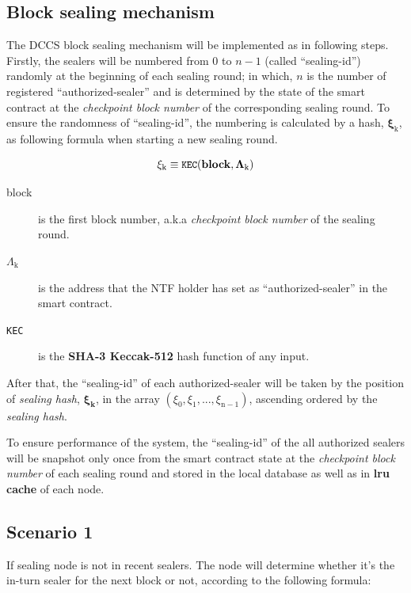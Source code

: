 \documentclass[12pt,oneside]{amsart}
\begin{document}
\begin{multicols}{2}
\section{Block sealing mechanism}\label{sec:sealing}
The {\small DCCS} block sealing mechanism will be implemented  as in following steps. Firstly, the sealers will be numbered from $0$ to $n - 1$ (called ``sealing-id'') randomly at the beginning of each sealing round; in which, $n$ is the number of registered ``authorized-sealer'' and is determined by the state of the smart contract at the \textit{checkpoint block number} of the corresponding sealing round. To ensure the randomness of ``sealing-id'', the numbering is calculated by a hash,  $\boldsymbol{\xi_{\mathrm{k}}}$, as following formula when starting a new sealing round.

\begin{equation}
\xi_{\mathrm{k}} \equiv \texttt{\small KEC}(\mathbf{block}, \mathbf{\Lambda_{\mathrm{k}}})
\end{equation}

\begin{description}
\item[block] is the first block number, a.k.a  \textit{checkpoint block number} of the sealing round.
\item[$\Lambda_{\mathrm{k}}$] is the address that the {\small NTF} holder has set as ``authorized-sealer'' in the smart contract.
\item[\texttt{\small KEC}] is the \textbf{\small {SHA-3 Keccak-512}} hash function of any input.
\end{description}

After that, the ``sealing-id'' of each authorized-sealer will be taken by the position of \textit{sealing hash}, $\boldsymbol{\xi_k}$, in the array $(\xi_{\mathrm{0}}, \xi_{\mathrm{1}}, ..., \xi_{\mathrm{n-1}})$, ascending ordered by the \textit{sealing hash}.

To ensure performance of the system, the ``sealing-id'' of the all authorized sealers will be snapshot only once from the smart contract state at the \textit{checkpoint block number} of each sealing round and stored in the local database as well as in \textbf{lru cache} of each node.

\subsection{Scenario 1}\label{ch:scenario_1} If sealing node is not in recent sealers. The node will determine whether it's the in-turn sealer for the next block or not, according to the following formula:


\end{multicols}
\end{document}
